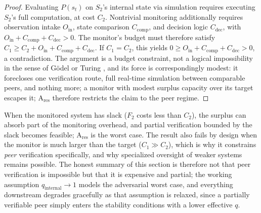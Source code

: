 \documentclass[manuscript,screen,review]{jair}
\begin{document}
\begin{proof}
Evaluating $P(s_t)$ on $S_2$'s internal state via simulation requires executing $S_2$'s full computation, at cost $C_2$. Nontrivial monitoring additionally requires observation intake $O_{\mathrm{in}}$, state comparison $C_{\mathrm{comp}}$, and decision logic $C_{\mathrm{dec}}$, with $O_{\mathrm{in}}+C_{\mathrm{comp}}+C_{\mathrm{dec}}>0$. The monitor's budget must therefore satisfy $C_1 \geq C_2 + O_{\mathrm{in}} + C_{\mathrm{comp}} + C_{\mathrm{dec}}$. If $C_1 = C_2$, this yields $0 \geq O_{\mathrm{in}}+C_{\mathrm{comp}}+C_{\mathrm{dec}} > 0$, a contradiction. The argument is a budget constraint, not a logical impossibility in the sense of G\"odel or Turing \cite{godel.1931,turing.1936}, and its force is correspondingly modest: it forecloses one verification route, full real-time simulation between comparable peers, and nothing more; a monitor with modest surplus capacity over its target escapes it; A$_{\mathrm{res}}$ therefore restricts the claim to the peer regime.
\end{proof}

When the monitored system has slack ($F_2$ costs less than $C_2$), the surplus can absorb part of the monitoring overhead, and partial verification bounded by the slack becomes feasible; A$_{\mathrm{res}}$ is the worst case. The result also fails by design when the monitor is much larger than the target ($C_1 \gg C_2$), which is why it constrains \emph{peer} verification specifically, and why specialized oversight of weaker systems remains possible. The honest summary of this section is therefore not that peer verification is impossible but that it is expensive and partial; the working assumption $q_{\mathrm{internal}} \to 1$ models the adversarial worst case, and everything downstream degrades gracefully as that assumption is relaxed, since a partially verifiable peer simply enters the stability conditions with a lower effective $q$.
\end{document}
